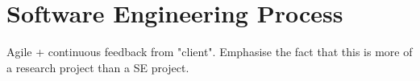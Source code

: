 \chapter*{Software Engineering Process}

Agile + continuous feedback from "client".
Emphasise the fact that this is more of a research project than a SE project.